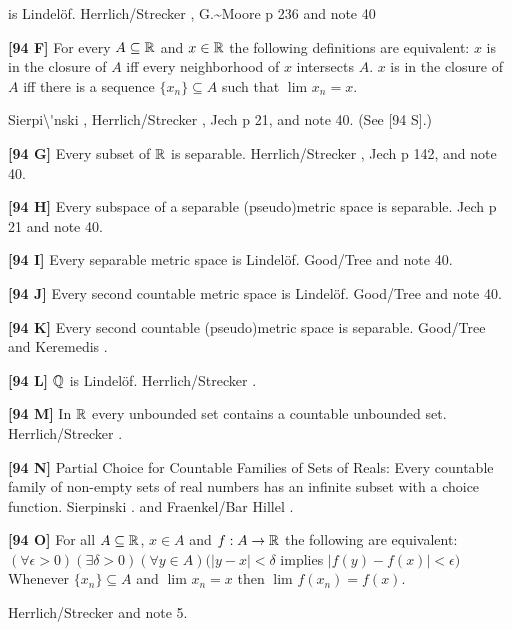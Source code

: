 is Lindel\"of.  \ac{Herrlich/Strecker} \cite{1997}, \ac{G.~Moore} \cite{1982}
p 236 and note 40
\smallskip
\item{}{\bf [94 F]} For every $A\subseteq{\Bbb R}$ and $x\in{\Bbb R}$
the following definitions are equivalent:
 $x$ is in the closure of $A$ iff every neighborhood of $x$
intersects $A$.
 $x$ is in the closure of $A$ iff there is a sequence
$\{x_{n}\}\subseteq A$ such that $\lim_{}x_{n}= x$.
\item{} \ac{Sierpi\'nski} \cite{1918}, \ac{Herrlich/Strecker} \cite{1997},
\ac{Jech} \cite{1973b} p 21, and note 40. (See [94 S].)
\smallskip
\item{}{\bf [94 G]}  Every subset of ${\Bbb R}$ is separable.
\ac{Herrlich/Strecker} \cite{1997}, \ac{Jech} \cite{1973b} p 142,
and note 40.
\smallskip
\item{}{\bf [94 H]} Every subspace of a separable (pseudo)metric space is
separable.  \ac{Jech} \cite{1973b} p 21 and note 40.
\smallskip
\item{}{\bf [94 I]}  Every separable metric space is Lindel\"of.
\ac{Good/Tree} \cite{1995} and note 40.
\smallskip
\item{}{\bf [94 J]}  Every second countable metric space is Lindel\"of.
\ac{Good/Tree} \cite{1995} and note 40.
\smallskip
\item{}{\bf [94 K]} Every second countable (pseudo)metric space is
separable.  \ac{Good/Tree} \cite{1995} and \ac{Keremedis} \cite{1998b}.
\smallskip
\item{}{\bf [94 L]} ${\Bbb Q}$ is Lindel\"of.  \ac{Herrlich/Strecker}
\cite{1997}.
\smallskip
\item{}{\bf [94 M]} In ${\Bbb R}$ every unbounded set contains a
countable unbounded set.  \ac{Herrlich/Strecker} \cite{1997}.
\smallskip
\item{}{\bf [94 N]}  Partial Choice for Countable Families of Sets of
Reals:  Every countable family of non-empty sets of real numbers has
an infinite subset with a choice function.  \ac{Sierpinski} \cite{1916}.
and \ac{Fraenkel/Bar Hillel} \cite{1958}.
\smallskip
\item{}{\bf [94 O]}  For all $A\subseteq{\Bbb R}$, $x\in A$ and $f: A
\rightarrow{\Bbb R}$ the following are equivalent:
 $(\forall\epsilon>0)(\exists\delta>0)(\forall y\in A)
(|y - x| <\delta$  implies $|f(y) - f(x)|<\epsilon)$
 Whenever $\{x_{n}\}\subseteq A$
and $\lim_{}x_{n} = x$ then $\lim_{}f(x_{n}) = f(x)$.
\item{} \ac{Herrlich/Strecker} \cite{1997} and note 5.
